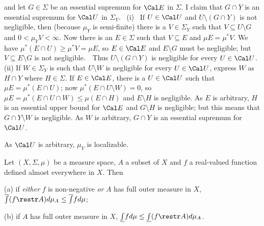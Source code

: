 {\noindent and let $G\in\Sigma$ be an essential supremum for $\Cal E$ in
$\Sigma$.   I claim that $G\cap Y$ is an essential supremum for $\Cal U$
in $\Sigma_Y$.   \Prf\ (i) \Quer\ If $U\in\Cal U$ and
$U\setminus(G\cap Y)$ is not negligible, then (because $\mu_Y$ is
semi-finite) there is a
$V\in\Sigma_Y$ such that $V\subseteq U\setminus G$ and
$0<\mu_YV<\infty$.   Now there is an $E\in\Sigma$ such that
$V\subseteq E$ and $\mu E=\mu^*V$.
We have $\mu^*(E\cap U)\ge\mu^*V=\mu E$, so $E\in\Cal E$ and
$E\setminus G$
must be negligible;  but $V\subseteq E\setminus G$ is not negligible.\
\BanG\   Thus $U\setminus(G\cap Y)$ is negligible for every
$U\in\Cal U$.
(ii)  If $W\in\Sigma_Y$ is such that $U\setminus W$ is negligible for
every $U\in\Cal U$, express $W$ as $H\cap Y$ where $H\in\Sigma$.   If
$E\in\Cal E$, there is a $U\in\Cal U$ such that $\mu E=\mu^*(E\cap U)$;
now $\mu^*(E\cap U\setminus W)=0$, so
$\mu E=\mu^*(E\cap U\cap W)\le\mu(E\cap H)$ and $E\setminus H$ is
negligible.   As $E$ is
arbitrary, $H$ is an essential upper bound for $\Cal E$ and
$G\setminus H$ is negligible;  but this means that $G\cap Y\setminus W$
is negligible.   As $W$ is arbitrary, $G\cap Y$ is an essential supremum
for $\Cal U$.\ \Qed

As $\Cal U$ is arbitrary, $\mu_Y$ is localizable.
}%

 Let $(X,\Sigma,\mu)$ be a measure space,
$A$ a subset of $X$ and $f$ a real-valued function defined almost
everywhere in $X$.   Then

(a)  if {\it either} $f$ is non-negative {\it or}
$A$ has full outer measure in $X$,
$\overline{\intop}(f\restr A)d\mu_A\le\overline{\intop}fd\mu$;

(b) if $A$ has full outer measure in $X$,
$\underline{\int}fd\mu\le\underline{\int}(f\restr A)d\mu_A$.



